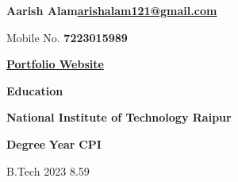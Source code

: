\documentclass{article}%
\begin{document}
\begin{flushleft}
\textbf{\Large{\huge Aarish Alam}}\hfill{\textbf{\href{mailto:arishalam121@gmail.com}{arishalam121@gmail.com}}}
\end{flushleft}
\hfill{Mobile No. \textbf{7223015989}}

\begin{flushleft}
{\href{https://rheagalfire.github.io}{\textbf{Portfolio Website}}}\hfill
\begin{minipage}{0.4\textwidth}
\raggedleft
\href{https://github.com/RheagalFire}{\faGithub}\hspace{2mm}
\href{https://www.linkedin.com/in/aarish-alam/}{\faLinkedin}\hspace{2mm}
\href{https://arishalam121.medium.com/}{\faMedium}\hspace{2mm}
\href{https://www.kaggle.com/arishalam}{\faKaggle}
\end{minipage}
\end{flushleft}

\begin{flushleft}
\bf {\Large{Education }}
\vspace{0.5mm}
\end{flushleft}
\begin{flushleft}
\textbf{\Large National Institute of Technology Raipur}
\end{flushleft}
\hline
\begin{flushleft}
\vspace{-1mm}
\textbf{Degree} \hfill{{\textbf{Year}}} \hfill {{\textbf{CPI}}}
\end{flushleft}
\vspace{-1mm}
\hline
\vspace{-1mm}
\begin{flushleft}
\text B.Tech  \hfill{{2023}} \hfill {{8.59}} 
\vspace{1mm}
\hline
\end{flushleft}
\end{document}

